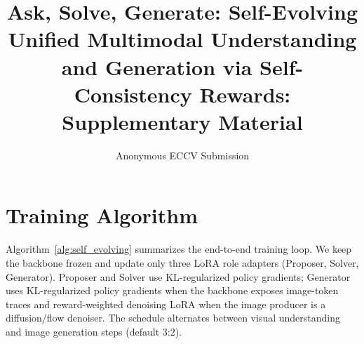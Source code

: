 \documentclass[runningheads]{llncs}
\begin{document}
\title{Ask, Solve, Generate: Self-Evolving Unified Multimodal Understanding and Generation via Self-Consistency Rewards: Supplementary Material}

\author{Anonymous ECCV Submission}

\maketitle

\setcounter{table}{0}
\renewcommand{\thetable}{S\arabic{table}}
\setcounter{figure}{0}
\renewcommand{\thefigure}{S\arabic{figure}}
\setcounter{algorithm}{0}
\renewcommand{\thealgorithm}{S\arabic{algorithm}}

\section{Training Algorithm}
\label{sec:sup_algorithm}

Algorithm~\ref{alg:self_evolving} summarizes the end-to-end training loop. We keep the backbone frozen and update only three LoRA role adapters (Proposer, Solver, Generator). Proposer and Solver use KL-regularized policy gradients; Generator uses KL-regularized policy gradients when the backbone exposes image-token traces and reward-weighted denoising LoRA when the image producer is a diffusion/flow denoiser. The schedule alternates between visual understanding and image generation steps (default 3:2).
\end{document}
